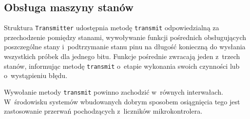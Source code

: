 \subsection{Obsługa maszyny stanów}
Struktura \texttt{Transmitter} udostępnia metodę \texttt{transmit} odpowiedzialną
za przechodzenie pomiędzy stanami, wywoływanie funkcji pośrednich obsługujących
poszczególne stany i~podtrzymanie stanu pinu na długość konieczną do wysłania
wszystkich próbek dla jednego bitu.
Funkcje pośrednie zwracają jeden z~trzech stanów, informując metodę 
\texttt{transmit} o~etapie wykonania swoich czynności lub o~wystąpieniu błędu.

Wywołanie metody \texttt{transmit} powinno zachodzić w~równych interwałach. W~środowisku
systemów wbudowanych dobrym sposobem osiągnięcia tego jest zastosowanie 
przerwań pochodzących z~liczników mikrokontrolera.